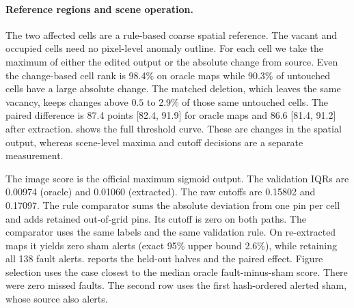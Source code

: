 \paragraph{Reference regions and scene operation.}
The two affected cells are a rule-based coarse spatial reference. The vacant and occupied cells need no pixel-level anomaly outline. For each cell we take the maximum of either the edited output or the absolute change from source. Even the change-based cell rank is 98.4\% on oracle maps while 90.3\% of untouched cells have a large absolute change. The matched deletion, which leaves the same vacancy, keeps changes above $0.5$ to 2.9\% of those same untouched cells. The paired difference is 87.4 points [82.4, 91.9] for oracle maps and 86.6 [81.4, 91.2] after extraction.  shows the full threshold curve. These are changes in the spatial output, whereas scene-level maxima and cutoff decisions are a separate measurement.

The image score is the official maximum sigmoid output. The validation IQRs are 0.00974 (oracle) and 0.01060 (extracted). The raw cutoffs are 0.15802 and 0.17097. The rule comparator sums the absolute deviation from one pin per cell and adds retained out-of-grid pins. Its cutoff is zero on both paths. The comparator uses the same labels and the same validation rule. On re-extracted maps it yields zero sham alerts (exact 95\% upper bound 2.6\%), while retaining all 138 fault alerts.  reports the held-out halves and the paired effect. Figure selection uses the case closest to the median oracle fault-minus-sham score. There were zero missed faults. The second row uses the first hash-ordered alerted sham, whose source also alerts.

\begin{table}[t]
\centering
\caption{\textbf{Held-out halves for the SALAD photo intervention.} Sham, Fault and Del. count alerts. All fault and deletion recalls are 100\% on the respective support. Bootstrap intervals for tied all-success contrasts are conditional on the sample.}
\label{tab:halves}
\scriptsize
\setlength{\tabcolsep}{3.3pt}

\end{table}


